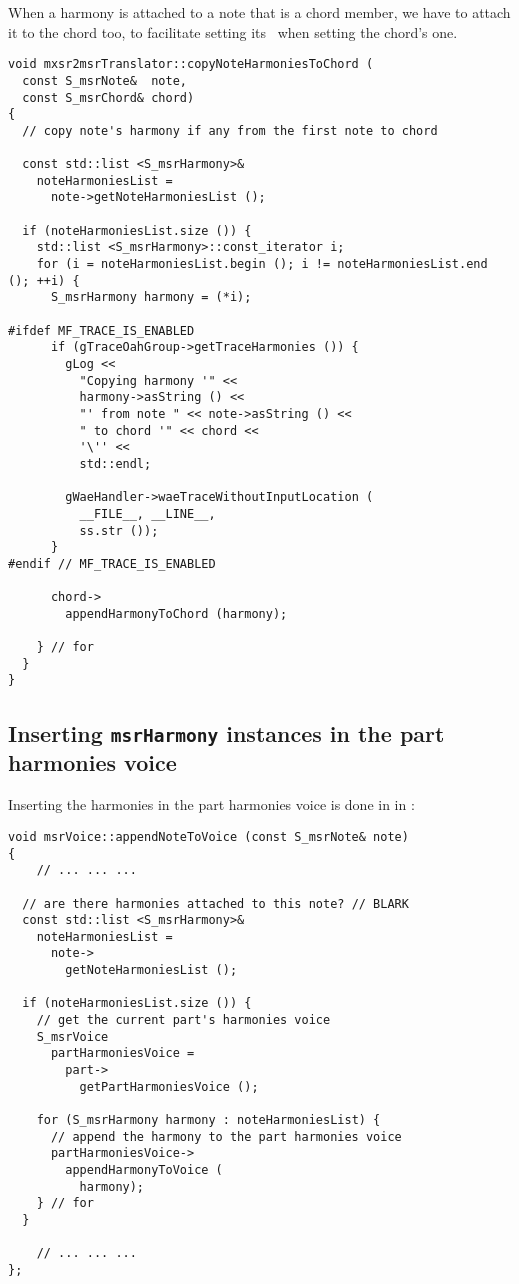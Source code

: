 When a harmony is attached to a note that is a chord member, we have to attach it to the chord too, to facilitate setting its \pim\ when setting the chord's one.
\begin{lstlisting}[language=CPlusPlus]
void mxsr2msrTranslator::copyNoteHarmoniesToChord (
  const S_msrNote&  note,
  const S_msrChord& chord)
{
  // copy note's harmony if any from the first note to chord

  const std::list <S_msrHarmony>&
    noteHarmoniesList =
      note->getNoteHarmoniesList ();

  if (noteHarmoniesList.size ()) {
    std::list <S_msrHarmony>::const_iterator i;
    for (i = noteHarmoniesList.begin (); i != noteHarmoniesList.end (); ++i) {
      S_msrHarmony harmony = (*i);

#ifdef MF_TRACE_IS_ENABLED
      if (gTraceOahGroup->getTraceHarmonies ()) {
        gLog <<
          "Copying harmony '" <<
          harmony->asString () <<
          "' from note " << note->asString () <<
          " to chord '" << chord <<
          '\'' <<
          std::endl;

        gWaeHandler->waeTraceWithoutInputLocation (
          __FILE__, __LINE__,
          ss.str ());
      }
#endif // MF_TRACE_IS_ENABLED

      chord->
        appendHarmonyToChord (harmony);

    } // for
  }
}
\end{lstlisting}


\subsection{Inserting {\tt msrHarmony} instances in the part harmonies voice}

Inserting the harmonies in the part harmonies voice is done in  in :
\begin{lstlisting}[language=CPlusPlus]
void msrVoice::appendNoteToVoice (const S_msrNote& note)
{
	// ... ... ...

  // are there harmonies attached to this note? // BLARK
  const std::list <S_msrHarmony>&
    noteHarmoniesList =
      note->
        getNoteHarmoniesList ();

  if (noteHarmoniesList.size ()) {
    // get the current part's harmonies voice
    S_msrVoice
      partHarmoniesVoice =
        part->
          getPartHarmoniesVoice ();

    for (S_msrHarmony harmony : noteHarmoniesList) {
      // append the harmony to the part harmonies voice
      partHarmoniesVoice->
        appendHarmonyToVoice (
          harmony);
    } // for
  }

	// ... ... ...
};
\end{lstlisting}


